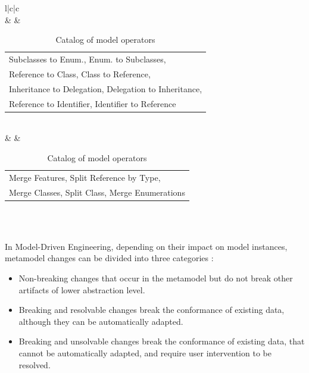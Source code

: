 \begin{table}[H]
{{\begin{tabular}{l|c|c}
  			\\   
  			&  
  			&  \begin{tabular}[c]{@{}l@{}} Subclasses to Enum., Enum. to Subclasses,\\ Reference to Class, Class to Reference, \\Inheritance to Delegation, Delegation to Inheritance,\\ Reference to Identifier, Identifier to Reference \end{tabular}
  			\\   
  			&  
  			&  \begin{tabular}[c]{@{}l@{}} Merge Features, Split Reference by Type,\\ Merge Classes, Split Class, Merge Enumerations\\\end{tabular}
  			\\
  			\\
  			\bottomrule
  			
  		\end{tabular}
  	}
  }
  \caption{Catalog of model operators} 
  \label{table:changesCatalog}
  \end{table}
  In Model-Driven Engineering, depending on their impact on model instances, metamodel changes can be divided into three categories \cite{gruschko2007towards}:
 \begin{itemize}
 	
 	\item	Non-breaking changes that occur in the metamodel but do not break other artifacts of lower abstraction level.%
 	\item Breaking and resolvable changes break the conformance of existing data, although they can be automatically adapted.
 	\item Breaking and unsolvable changes break the conformance of existing data, that cannot be automatically adapted, and require user intervention to be resolved.
 \end{itemize}
 
